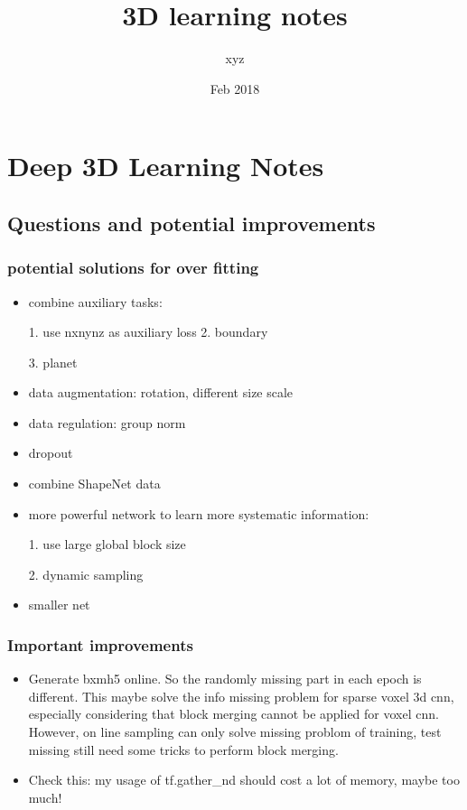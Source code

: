 \documentclass[,table,dvipsnames]{article}
\title{3D learning notes}
\author{xyz}
\date{Feb 2018}
\begin{document}
\noindent
\begin{titlepage}
\maketitle
\end{titlepage}	

\tableofcontents{}
\section{Deep 3D Learning Notes}

\subsection{Questions and potential improvements}
\subsubsection{potential solutions for over fitting}
\begin{itemize}
	\item combine auxiliary tasks:\par 
	1. use nxnynz as auxiliary loss
	2. boundary \par 
	3. planet \par 
	\item data augmentation: rotation, different size scale
	\item data regulation: group norm
	\item dropout
	\item combine ShapeNet data
	\item more powerful network to learn more systematic information:\par
	1. use large global block size\par
	2. dynamic sampling
	\item smaller net
\end{itemize}

\subsubsection{Important improvements}
\begin{itemize}
	\item Generate bxmh5 online. So the randomly missing part in each epoch is different. This maybe solve the info missing problem for sparse voxel 3d cnn, especially considering that block merging cannot be applied for voxel cnn. However, on line sampling can only solve missing problom of training, test missing still need some tricks to perform block merging.
	\item Check this: my usage of tf.gather\_nd should cost a lot of memory, maybe too much!
\end{itemize}
\end{document}
